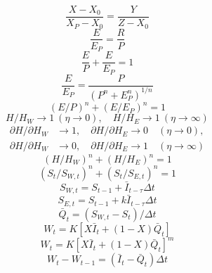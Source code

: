 \documentclass{article}
\begin{document}
\begin{equation}\frac{X-X_0}{X_P-X_0}=\frac{Y}{Z-X_0}\tag{1}\end{equation}
\begin{equation}\frac{E}{E_P}=\frac{R}{P}\tag{2}\end{equation}
\begin{equation}\frac{E}{P}+\frac{E}{E_P}=1\tag{3}\end{equation}
\begin{equation}\frac{E}{E_P}=\frac{P}{(P^n+E_P^n)^{1/n}}\tag{4}\end{equation}
\begin{equation}(E/P)^n+(E/E_P)^n=1\tag{5}\end{equation}
\begin{equation}H/H_W\to1\ (\eta\to0),\quad H/H_E\to1\ (\eta\to\infty)\tag{6}\end{equation}
\begin{equation}\begin{aligned}\partial H/\partial H_W&\to1,\quad\partial H/\partial H_E\to0\quad(\eta\to0),\\\partial H/\partial H_W&\to0,\quad\partial H/\partial H_E\to1\quad(\eta\to\infty)\end{aligned}\tag{7}\end{equation}
\begin{equation}(H/H_W)^n+(H/H_E)^n=1\tag{8}\end{equation}
\begin{equation}(S_t/S_{W,t})^n+(S_t/S_{E,t})^n=1\tag{9}\end{equation}
\begin{equation}S_{W,t}=S_{t-1}+\bar I_{t-\tau}\Delta t\tag{10}\end{equation}
\begin{equation}S_{E,t}=S_{t-1}+k\bar I_{t-\tau}\Delta t\tag{11}\end{equation}
\begin{equation}\bar Q_t=(S_{W,t}-S_t)/\Delta t\tag{12}\end{equation}
\begin{equation}W_t=K[X\bar I_t+(1-X)\bar Q_t]\tag{13}\end{equation}
\begin{equation}W_t=K[X\bar I_t+(1-X)\bar Q_t]^m\tag{14}\end{equation}
\begin{equation}W_t-W_{t-1}=(\bar I_t-\bar Q_t)\Delta t\tag{15}\end{equation}
\end{document}
